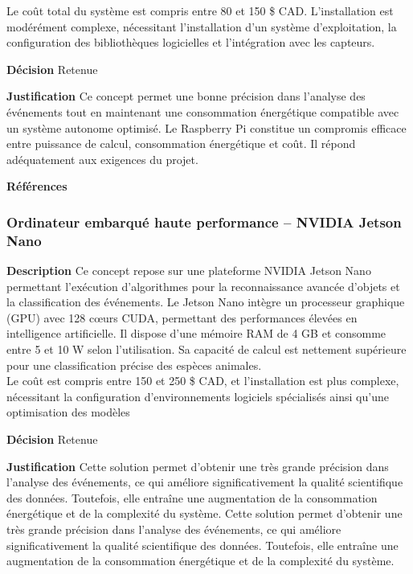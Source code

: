 Le coût total du système est compris entre 80 et 150 \$ CAD. L’installation est modérément complexe, nécessitant l’installation d’un système d’exploitation, la configuration des bibliothèques logicielles et l’intégration avec les capteurs.
\smallskip

\noindent\textbf{Décision} Retenue
\smallskip

\noindent\textbf{Justification} Ce concept permet une bonne précision dans l’analyse des événements tout en maintenant une consommation énergétique compatible avec un système autonome optimisé. Le Raspberry Pi constitue un compromis efficace entre puissance de calcul, consommation énergétique et coût. Il répond adéquatement aux exigences du projet.
\smallskip

\noindent\textbf{Références} 
\cite{Raspberry1}
\cite{Raspberry2}
\cite{Rapsberry3}

\subsubsection{Ordinateur embarqué haute performance – NVIDIA Jetson Nano}
\label{sec:nano}
\noindent\textbf{Description} Ce concept repose sur une plateforme NVIDIA Jetson Nano permettant l’exécution d’algorithmes pour la reconnaissance avancée d’objets et la classification des événements.
Le Jetson Nano intègre un processeur graphique (GPU) avec 128 cœurs CUDA, permettant des performances élevées en intelligence artificielle. Il dispose d’une mémoire RAM de 4 GB et consomme entre 5 et 10 W selon l’utilisation. Sa capacité de calcul est nettement supérieure pour une classification précise des espèces animales.
\\

Le coût est compris entre 150 et 250 \$ CAD, et
l’installation est plus complexe, nécessitant la configuration d’environnements logiciels spécialisés ainsi qu’une optimisation des modèles
\smallskip

\noindent\textbf{Décision} Retenue
\smallskip

\noindent\textbf{Justification} Cette solution permet d’obtenir une très grande précision dans l’analyse des événements, ce qui améliore significativement la qualité scientifique des données. Toutefois, elle entraîne une augmentation de la consommation énergétique et de la complexité du système. Cette solution permet d’obtenir une très grande précision dans l’analyse des événements, ce qui améliore significativement la qualité scientifique des données. Toutefois, elle entraîne une augmentation de la consommation énergétique et de la complexité du système.
\smallskip

